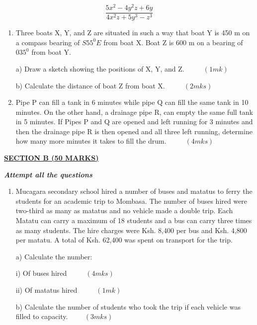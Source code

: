 \documentclass[
  a4paperpaper,
]{scrbook}
\begin{document}
\begin{tcolorbox}
\[ \frac{5x^2-4y^2z+6y}{4x^2z+5y^3-z^3}\]

\begin{enumerate}
\def\labelenumi{\arabic{enumi}.}
\setcounter{enumi}{13}
\item
  Three boats X, Y, and Z are situated in such a way that boat Y is 450
  m on a compass bearing of \(S55^0E\) from boat X. Boat Z is 600 m on a
  bearing of \(035^0\) from boat Y.

  a) Draw a sketch showing the positions of X, Y, and Z.
  \(\hspace{1cm} (1mk)\)

  b) Calculate the distance of boat Z from boat X.
  \(\hspace{1cm} (2mks)\)
\item
  Pipe P can fill a tank in 6 minutes while pipe Q can fill the same
  tank in 10 minutes. On the other hand, a drainage pipe R, can empty
  the same full tank in 5 minutes. If Pipes P and Q are opened and left
  running for 3 minutes and then the drainage pipe R is then opened and
  all three left running, determine how many more minutes it takes to
  fill the drum. \(\hspace{1cm}(4mks)\)
\end{enumerate}

\ul{\textbf{SECTION B (50 MARKS)}}

\textbf{\emph{Attempt all the questions}}

\begin{enumerate}
\def\labelenumi{\arabic{enumi}.}
\setcounter{enumi}{15}
\item
  Mucagara secondary school hired a number of buses and matatus to ferry
  the students for an academic trip to Mombasa. The number of buses
  hired were two-third as many as matatus and no vehicle made a double
  trip. Each Matatu can carry a maximum of 18 students and a bus can
  carry three times as many students. The hire charges were Ksh. 8,400
  per bus and Ksh. 4,800 per matatu. A total of Ksh. 62,400 was spent on
  transport for the trip.

  a) Calculate the number:

  i) Of buses hired \(\hspace{1cm} (4mks)\)

  ii) Of matatus hired \(\hspace{1cm} (1mk)\)

  b) Calculate the number of students who took the trip if each vehicle
  was filled to capacity.\(\hspace{1cm} (3mks)\)


\end{enumerate}
\end{tcolorbox}
\end{document}

